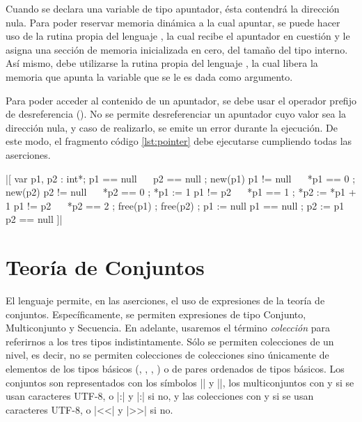 Cuando se declara una variable de tipo apuntador, ésta contendrá la dirección
nula. Para poder reservar memoria dinámica a la cual apuntar, se puede hacer
uso de la rutina propia del lenguaje , la cual recibe el apuntador
en cuestión y le asigna una sección de memoria inicializada en cero, del
tamaño del tipo interno. Así mismo, debe utilizarse la rutina propia del
lenguaje , la cual libera la memoria que apunta la variable que
se le es dada como argumento.

Para poder acceder al contenido de un apuntador, se debe usar el operador
prefijo de desreferencia (\ingra{*}). No se permite desreferenciar un
apuntador cuyo valor sea la dirección nula, y caso de realizarlo, se emite un
error durante la ejecución. De este modo, el fragmento código
\ref{lst:pointer} debe ejecutarse cumpliendo todas las aserciones.

\begin{gracielacode}[caption=Uso de apuntadores, label=lst:pointer]
|[ var p1, p2 : int*; { p1 == null ~\Land~  p2 == null }
 ; new(p1)            { p1 != null ~\Land~ *p1 == 0 }
 ; new(p2)            { p2 != null ~\Land~ *p2 == 0 }
 ; *p1 := 1           { p1 != p2   ~\Land~ *p1 == 1 }
 ; *p2 := *p1 + 1     { p1 != p2   ~\Land~ *p2 == 2 }
 ; free(p1)
 ; free(p2)
 ; p1 := null         { p1 == null }
 ; p2 := p1           { p2 == null }
]|
\end{gracielacode}

\section{Teoría de Conjuntos}

El lenguaje permite, en las aserciones, el uso de expresiones de la teoría de
conjuntos. Específicamente, se permiten expresiones de tipo Conjunto,
Multiconjunto y Secuencia. En adelante, usaremos el término \textit{colección}
para referirnos a los tres tipos indistintamente. Sólo se permiten colecciones
de un nivel, es decir, no se permiten colecciones de colecciones sino únicamente
de elementos de los tipos básicos (, , ,
) o de pares ordenados de tipos básicos. Los conjuntos son
representados con los símbolos \ingra|{| y \ingra|}|, los multiconjuntos con
\Lbag{} y \Rbag{} si se usan caracteres UTF-8, o \ingra|{:| y \ingra|:}| si no, y
las colecciones con \Lseq{} y \Rseq{} si se usan caracteres UTF-8, o \ingra|<<| y
\ingra|>>| si no.


